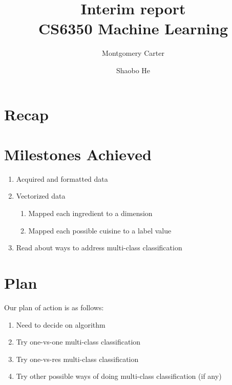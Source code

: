 \documentclass[11pt]{article}
\title{Interim report\\CS6350 Machine Learning}
\author{Montgomery Carter \and Shaobo He}
\begin{document}
\maketitle

\section{Recap}

\section{Milestones Achieved}
\label{sec:background}
\begin{enumerate}
	\item Acquired and formatted data
	\item Vectorized data
	\begin{enumerate}
		\item Mapped each ingredient to a dimension
		\item Mapped each possible cuisine to a label value
	\end{enumerate}
	\item Read about ways to address multi-class classification
\end{enumerate}


\section{Plan}
\label{sec:plan}

Our plan of action is as follows: 

\begin{enumerate}
\item Need to decide on algorithm
\item Try one-vs-one multi-class classification
\item Try one-vs-res multi-class classification
\item Try other possible ways of doing multi-class classification (if any) 
\end{enumerate}

\newpage


\end{document}
